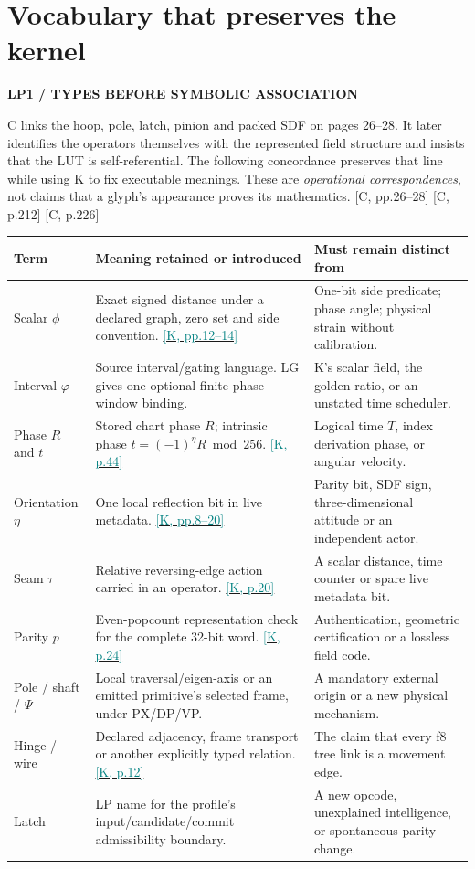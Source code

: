 \documentclass[11pt,a4paper]{article}
\newcommand{\kref}[1]{\hyperlink{baseline.#1}{\textcolor{teal}{[K, p.#1]}}}
\newcommand{\krange}[2]{\hyperlink{baseline.#1}{\textcolor{teal}{[K, pp.#1--#2]}}}
\newcommand{\crefpage}[1]{\textcolor{muted}{[C, p.#1]}}
\newcommand{\crefrange}[2]{\textcolor{muted}{[C, pp.#1--#2]}}
\newcommand{\status}[1]{{\sffamily\bfseries\scriptsize\color{teal}#1}\par}
\newcommand{\sectionstart}[1]{\par\addvspace{18pt}\Needspace{12\baselineskip}\section{#1}}
\theoremstyle{lpstyle}
\newcommand{\sbit}[1]{(-1)^{#1}}
\begin{document}
\sectionstart{Vocabulary that preserves the kernel}
\status{LP1 / TYPES BEFORE SYMBOLIC ASSOCIATION}
C links the hoop, pole, latch, pinion and packed SDF on pages 26--28. It later identifies the operators themselves with the represented field structure and insists that the LUT is self-referential. The following concordance preserves that line while using K to fix executable meanings. These are \emph{operational correspondences}, not claims that a glyph's appearance proves its mathematics. \crefrange{26}{28} \crefpage{212} \crefpage{226}

\begin{longtable}{L{28mm}L{53mm}L{72mm}}
\toprule
\textbf{Term}&\textbf{Meaning retained or introduced}&\textbf{Must remain distinct from}\\\midrule\endhead
Scalar $\phi$&Exact signed distance under a declared graph, zero set and side convention. \krange{12}{14}&One-bit side predicate; phase angle; physical strain without calibration.\\
Interval $\varphi$&Source interval/gating language. LG gives one optional finite phase-window binding.&K's scalar field, the golden ratio, or an unstated time scheduler.\\
Phase $R$ and $t$&Stored chart phase $R$; intrinsic phase $t=\sbit{\eta}R\bmod256$. \kref{44}&Logical time $T$, index derivation phase, or angular velocity.\\
Orientation $\eta$&One local reflection bit in live metadata. \krange{8}{20}&Parity bit, SDF sign, three-dimensional attitude or an independent actor.\\
Seam $\tau$&Relative reversing-edge action carried in an operator. \kref{20}&A scalar distance, time counter or spare live metadata bit.\\
Parity $p$&Even-popcount representation check for the complete 32-bit word. \kref{24}&Authentication, geometric certification or a lossless field code.\\
Pole / shaft / $\Psi$&Local traversal/eigen-axis or an emitted primitive's selected frame, under PX/DP/VP.&A mandatory external origin or a new physical mechanism.\\
Hinge / wire&Declared adjacency, frame transport or another explicitly typed relation. \kref{12}&The claim that every f8 tree link is a movement edge.\\
Latch&LP name for the profile's input/candidate/commit admissibility boundary.&A new opcode, unexplained intelligence, or spontaneous parity change.\\

\end{longtable}
\end{document}

